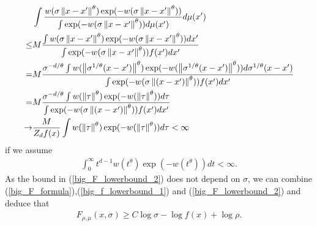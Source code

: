 \documentclass[10pt]{article}
\begin{document}
\begin{align} \label{big_F_lowerbound_2}
         & \int \frac{w(\sigma\left\lVert x-x'\right\rVert^{\theta})\exp(-w(\sigma\left\lVert x-x'\right\rVert^{\theta}))}{\int \exp(-w(\sigma\left\lVert x-x'\right\rVert^{\theta})) d\mu(x')} d\mu(x') \nonumber                                                                  \\
    \leq & M \frac{\int w(\sigma\left\lVert x-x'\right\rVert^{\theta})\exp(-w(\sigma\left\lVert x-x'\right\rVert^{\theta}))dx'}{\int \exp(-w(\sigma\left\lVert x-x'\right\rVert^{\theta}))f(x') dx'} \nonumber                                                                      \\
    =    & M \frac{\sigma^{-d/\theta}\int w(\left\lVert\sigma^{1/\theta}(x-x')\right\rVert^{\theta})\exp(-w(\left\lVert\sigma^{1/\theta}(x-x')\right\rVert^{\theta}))d\sigma^{1/\theta}(x-x')}{ \int \exp(-w(\sigma \left\lVert(x-x')\right\rVert^{\theta}))f(x') dx'} \nonumber \\
    =    & M \frac{\sigma^{-d/\theta}\int w(\left\lVert\tau\right\rVert^{\theta})\exp(-w(\left\lVert\tau\right\rVert^{\theta}))d\tau}{ \int \exp(-w(\sigma \left\lVert(x-x')\right\rVert^{\theta}))f(x') dx'} \nonumber                                                          \\
    \to  & \frac{M}{Z_d f(x)} \int w(\left\lVert\tau\right\rVert^{\theta})\exp(-w(\left\lVert\tau\right\rVert^{\theta}))d\tau < \infty
\end{align}
if we assume
\begin{align}
    \int_0^{\infty} t^{d-1}w(t^{\theta})\exp(-w(t^{\theta}))dt < \infty.
\end{align}
As the bound in (\ref{big_F_lowerbound_2}) does not depend on $\sigma$, we can combine (\ref{big_F_formula}),(\ref{big_f_lowerbound_1}) and (\ref{big_F_lowerbound_2}) and deduce that
\begin{align} \label{big_F_lowerbound_final}
    F_{\rho,\mu}(x,\sigma) \geq C \log \sigma - \log f(x) + \log \rho.
\end{align}
\end{document}
